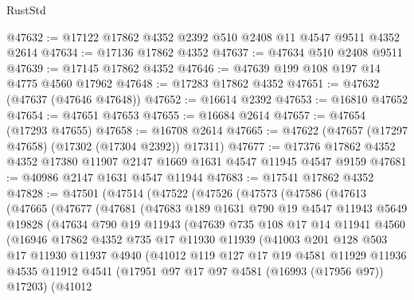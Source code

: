 \begin{lexlean}{RustStd}
\begin{coremodule}
{\begin{coremodule}
{{{{{{{{{{{{{{{{{{{{{{{{{{{{{{{{{{{{{{{{{{{{{{{{{{{{{{{@47632 := @17122 @17862 @4352 @2392 @510 @2408 @11 @4547 @9511 @4352 @2614
@47634 := @17136 @17862 @4352
@47637 := @47634 @510 @2408 @9511
@47639 := @17145 @17862 @4352
@47646 := @47639 @199 @108 @197 @14 @4775 @4560 @17962
@47648 := @17283 @17862 @4352
@47651 := @47632 (@47637 (@47646 @47648))
@47652 := @16614 @2392
@47653 := @16810 @47652
@47654 := @47651 @47653
@47655 := @16684 @2614
@47657 := @47654 (@17293 @47655)
@47658 := @16708 @2614
@47665 := @47622 (@47657 (@17297 @47658) (@17302 (@17304 @2392)) @17311)
@47677 := @17376 @17862 @4352 @4352 @17380 @11907 @2147 @1669 @1631 @4547 @11945 @4547 @9159
@47681 := @40986 @2147 @1631 @4547 @11944
@47683 := @17541 @17862 @4352
@47828 := @47501
    (@47514
      (@47522
        (@47526
          (@47573
            (@47586
              (@47613
                (@47665
                  (@47677
                    (@47681
                      (@47683
                        @189
                        @1631
                        @790
                        @19
                        @4547
                        @11943
                        @5649
                        @19828
                        (@47634
                          @790
                          @19
                          @11943
                          (@47639
                            @735
                            @108
                            @17
                            @14
                            @11941
                            @4560
                            (@16946
                              @17862
                              @4352
                              @735
                              @17
                              @11930
                              @11939
                              (@41003
                                @201
                                @128
                                @503
                                @17
                                @11930
                                @11937
                                @4940
                                (@41012
                                  @119
                                  @127
                                  @17
                                  @19
                                  @4581
                                  @11929
                                  @11936
                                  @4535
                                  @11912
                                  @4541
                                  (@17951 @97 @17 @97 @4581 (@16993 (@17956 @97)) @17203)
                                  (@41012
}}}}}}}}}}}}}}}}}}}}}}}}}}}}}}}}}}}}}}}}}}}}}}}}}}}}}}}
\end{coremodule}}
\end{coremodule}
\end{lexlean}
